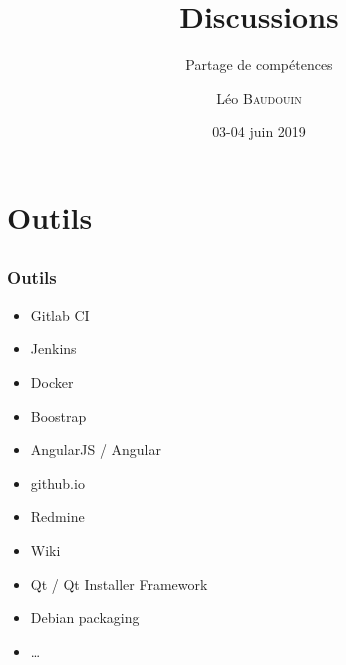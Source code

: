 \documentclass{beamer}
\title{Discussions}
\subtitle{Partage de compétences}
\author{L\'eo \textsc{Baudouin}}
\institute{
  {\url{baudouin.leo @ gmail.com}}
}
\date{03-04 juin 2019}
\begin{document}
\begin{frame}
  \titlepage
\end{frame}




\section{Outils}
\subsection{}

\begin{frame}
  \frametitle{Outils}
  \begin{block}{}
  \begin{itemize}[<+->]
  \item Gitlab CI
  \item Jenkins
  \item Docker
  \item Boostrap
  \item AngularJS / Angular
  \item github.io
  \item Redmine
  \item Wiki
  \item Qt / Qt Installer Framework
  \item Debian packaging
  \item \dots
  \end{itemize}
  \end{block}  
\end{frame}

\end{document}
